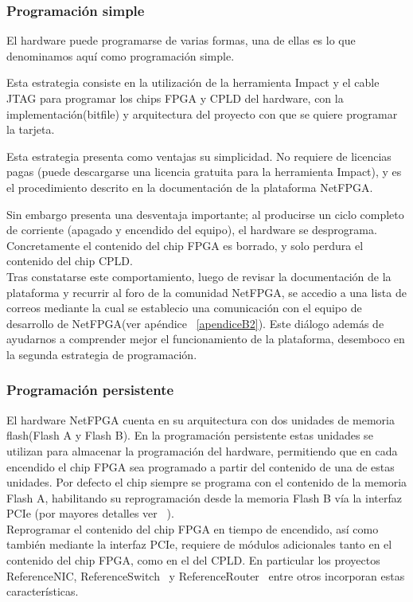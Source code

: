 \subsubsection{Programaci\'on simple}
El hardware puede programarse de varias formas, una de ellas es lo que denominamos aqu\'i como programaci\'on simple. 

Esta estrategia consiste en la utilizaci\'on de la herramienta Impact y el cable JTAG para programar los chips FPGA y CPLD del hardware, con la implementaci\'on(bitfile) y arquitectura del proyecto con que se quiere programar la tarjeta.

Esta estrategia presenta como ventajas su simplicidad. No requiere de licencias pagas (puede descargarse una licencia gratuita para la herramienta Impact), y es el procedimiento descrito en la documentaci\'on de la plataforma NetFPGA.

Sin embargo presenta una desventaja importante; al producirse un ciclo completo de corriente (apagado y encendido del equipo), el hardware se desprograma. Concretamente el contenido del chip FPGA es borrado, y solo perdura el contenido del chip CPLD.\\

Tras constatarse este comportamiento, luego de revisar la documentaci\'on de la plataforma y recurrir al foro de la comunidad NetFPGA, se accedio a una lista de correos mediante la cual se establecio una comunicaci\'on con el equipo de desarrollo de NetFPGA(ver ap\'endice ~\ref{apendiceB2}). Este di\'alogo adem\'as de ayudarnos a comprender mejor el funcionamiento de la plataforma, desemboco en la segunda estrategia de programaci\'on.

\subsubsection{Programaci\'on persistente}
El hardware NetFPGA cuenta en su arquitectura con dos unidades de memoria flash(Flash A y Flash B). En la programaci\'on persistente estas unidades se utilizan para almacenar la programaci\'on del hardware, permitiendo que en cada encendido el chip FPGA sea programado a partir del contenido de una de estas unidades. Por defecto el chip siempre se programa con el contenido de la memoria Flash A, habilitando su reprogramaci\'on desde la memoria Flash B v\'ia la interfaz PCIe (por mayores detalles ver ~\citep{PCIEProgProject}).\\

Reprogramar el contenido del chip FPGA en tiempo de encendido, así como también mediante la interfaz PCIe, requiere de módulos adicionales tanto en el contenido del chip FPGA, como en el del CPLD. En particular los proyectos ReferenceNIC, ReferenceSwitch~\citep{ReferenceSwitchProject} y ReferenceRouter~\citep{ReferenceRouterProject} entre otros incorporan estas características.\\

